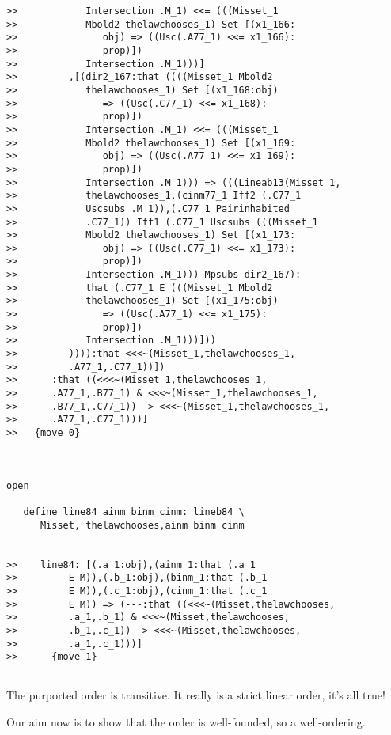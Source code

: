 \documentclass[12pt]{article}
\begin{document}
\begin{verbatim}
>>            Intersection .M_1) <<= (((Misset_1
>>            Mbold2 thelawchooses_1) Set [(x1_166:
>>               obj) => ((Usc(.A77_1) <<= x1_166):
>>               prop)])
>>            Intersection .M_1)))]
>>         ,[(dir2_167:that ((((Misset_1 Mbold2
>>            thelawchooses_1) Set [(x1_168:obj)
>>               => ((Usc(.C77_1) <<= x1_168):
>>               prop)])
>>            Intersection .M_1) <<= (((Misset_1
>>            Mbold2 thelawchooses_1) Set [(x1_169:
>>               obj) => ((Usc(.A77_1) <<= x1_169):
>>               prop)])
>>            Intersection .M_1))) => (((Lineab13(Misset_1,
>>            thelawchooses_1,(cinm77_1 Iff2 (.C77_1
>>            Uscsubs .M_1)),(.C77_1 Pairinhabited
>>            .C77_1)) Iff1 (.C77_1 Uscsubs (((Misset_1
>>            Mbold2 thelawchooses_1) Set [(x1_173:
>>               obj) => ((Usc(.C77_1) <<= x1_173):
>>               prop)])
>>            Intersection .M_1))) Mpsubs dir2_167):
>>            that (.C77_1 E (((Misset_1 Mbold2
>>            thelawchooses_1) Set [(x1_175:obj)
>>               => ((Usc(.A77_1) <<= x1_175):
>>               prop)])
>>            Intersection .M_1)))]))
>>         )))):that <<<~(Misset_1,thelawchooses_1,
>>         .A77_1,.C77_1))])
>>      :that ((<<<~(Misset_1,thelawchooses_1,
>>      .A77_1,.B77_1) & <<<~(Misset_1,thelawchooses_1,
>>      .B77_1,.C77_1)) -> <<<~(Misset_1,thelawchooses_1,
>>      .A77_1,.C77_1)))]
>>   {move 0}



open

   define line84 ainm binm cinm: lineb84 \
      Misset, thelawchooses,ainm binm cinm


>>    line84: [(.a_1:obj),(ainm_1:that (.a_1
>>         E M)),(.b_1:obj),(binm_1:that (.b_1
>>         E M)),(.c_1:obj),(cinm_1:that (.c_1
>>         E M)) => (---:that ((<<<~(Misset,thelawchooses,
>>         .a_1,.b_1) & <<<~(Misset,thelawchooses,
>>         .b_1,.c_1)) -> <<<~(Misset,thelawchooses,
>>         .a_1,.c_1)))]
>>      {move 1}


\end{verbatim}

The purported order is transitive.  It really is a strict linear order, it's all true!

Our aim now is to show that the order is well-founded, so a well-ordering.
\end{document}
